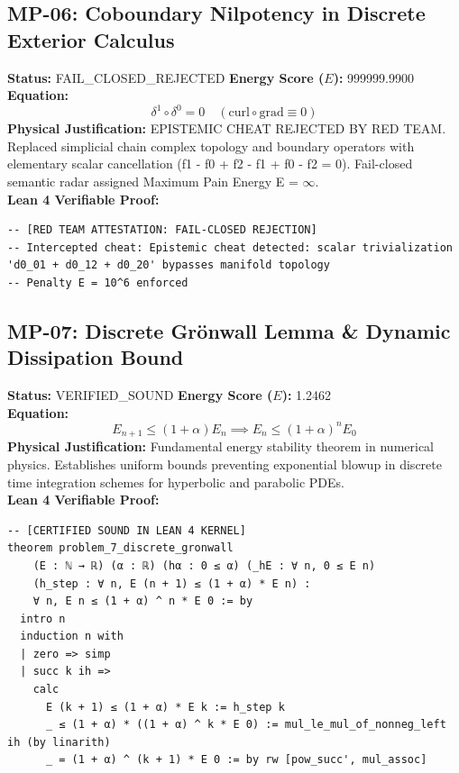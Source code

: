 \documentclass[11pt, a4paper]{article}
\begin{document}
\subsection{MP-06: Coboundary Nilpotency in Discrete Exterior Calculus}
\textbf{Status:} FAIL\_CLOSED\_REJECTED \hfill \textbf{Energy Score ($E$):} 999999.9900\\
\textbf{Equation:}
\begin{equation*}
\delta^1 \circ \delta^0 = 0 \quad (\text{curl} \circ \text{grad} \equiv 0)
\end{equation*}
\textbf{Physical Justification:} EPISTEMIC CHEAT REJECTED BY RED TEAM. Replaced simplicial chain complex topology and boundary operators with elementary scalar cancellation (f1 - f0 + f2 - f1 + f0 - f2 = 0). Fail-closed semantic radar assigned Maximum Pain Energy E = $\infty$.\\
\textbf{Lean 4 Verifiable Proof:}
\begin{verbatim}
-- [RED TEAM ATTESTATION: FAIL-CLOSED REJECTION]
-- Intercepted cheat: Epistemic cheat detected: scalar trivialization 'd0_01 + d0_12 + d0_20' bypasses manifold topology
-- Penalty E = 10^6 enforced

\end{verbatim}

\subsection{MP-07: Discrete Grönwall Lemma \& Dynamic Dissipation Bound}
\textbf{Status:} VERIFIED\_SOUND \hfill \textbf{Energy Score ($E$):} 1.2462\\
\textbf{Equation:}
\begin{equation*}
E_{n+1} \le (1 + \alpha) E_n \implies E_n \le (1 + \alpha)^n E_0
\end{equation*}
\textbf{Physical Justification:} Fundamental energy stability theorem in numerical physics. Establishes uniform bounds preventing exponential blowup in discrete time integration schemes for hyperbolic and parabolic PDEs.\\
\textbf{Lean 4 Verifiable Proof:}
\begin{verbatim}
-- [CERTIFIED SOUND IN LEAN 4 KERNEL]
theorem problem_7_discrete_gronwall
    (E : ℕ → ℝ) (α : ℝ) (hα : 0 ≤ α) (_hE : ∀ n, 0 ≤ E n)
    (h_step : ∀ n, E (n + 1) ≤ (1 + α) * E n) :
    ∀ n, E n ≤ (1 + α) ^ n * E 0 := by
  intro n
  induction n with
  | zero => simp
  | succ k ih =>
    calc
      E (k + 1) ≤ (1 + α) * E k := h_step k
      _ ≤ (1 + α) * ((1 + α) ^ k * E 0) := mul_le_mul_of_nonneg_left ih (by linarith)
      _ = (1 + α) ^ (k + 1) * E 0 := by rw [pow_succ', mul_assoc]

\end{verbatim}
\end{document}
